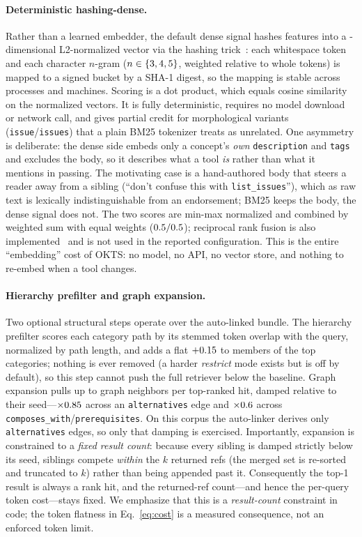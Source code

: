 \documentclass[11pt]{article}
\begin{document}
\paragraph{Deterministic hashing-dense.} Rather than a learned embedder, the
default dense signal hashes features into a \denseDim-dimensional
L2-normalized vector via the hashing trick~\citep{weinberger2009hashing}: each
whitespace token and each character $n$-gram ($n \in \{3,4,5\}$, weighted
\ngramWeight{} relative to whole tokens) is mapped to a signed bucket by a SHA-1
digest, so the mapping is stable across processes and machines. Scoring is a dot
product, which equals cosine similarity on the normalized vectors. It is fully
deterministic, requires no model download or network call, and gives partial
credit for morphological variants (\texttt{issue}/\texttt{issues}) that a plain
BM25 tokenizer treats as unrelated. One asymmetry is deliberate: the dense side
embeds only a concept's \emph{own} \texttt{description} and \texttt{tags} and
excludes the body, so it describes what a tool \emph{is} rather than what it
mentions in passing. The motivating case is a hand-authored body that steers a
reader away from a sibling (``don't confuse this with \texttt{list\_issues}''),
which as raw text is lexically indistinguishable from an endorsement; BM25 keeps
the body, the dense signal does not. The two scores are
min-max normalized and combined by weighted sum with equal weights
($0.5/0.5$); reciprocal rank fusion is also
implemented~\citep{cormack2009rrf} and is not used in the reported
configuration. This is the entire ``embedding'' cost of OKTS: no model, no API,
no vector store, and nothing to re-embed when a tool changes.

\paragraph{Hierarchy prefilter and graph expansion.} Two optional structural
steps operate over the auto-linked bundle. The hierarchy prefilter scores each
category path by its stemmed token overlap with the query, normalized by path
length, and adds a flat $+0.15$ to members of the top \hierTopCats{}
categories; nothing is ever removed (a harder \emph{restrict} mode exists but is
off by default), so this step cannot push the full retriever below the baseline.
Graph expansion pulls up to \graphMaxPerHit{} graph neighbors per top-ranked hit,
damped relative to their seed---$\times0.85$ across an
\texttt{alternatives} edge and $\times0.6$ across
\texttt{composes\_with}/\texttt{prerequisites}. On this corpus the auto-linker
derives only \texttt{alternatives} edges, so only that damping is exercised.
Importantly, expansion is constrained to a \emph{fixed result count}: because
every sibling is damped strictly below its seed, siblings compete \emph{within}
the $k$ returned refs (the merged set is re-sorted and truncated to $k$) rather
than being appended past it. Consequently the top-1 result is always a rank hit,
and the returned-ref count---and hence the per-query token cost---stays fixed.
We emphasize that this is a \emph{result-count} constraint in code; the token
flatness in Eq.~\ref{eq:cost} is a measured consequence, not an enforced token
limit.
\end{document}

